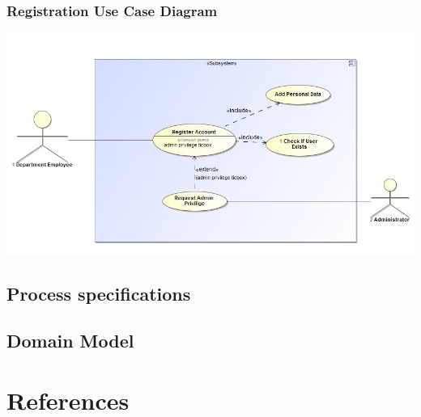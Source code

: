 \documentclass[a4paper,12pt]{article}
\begin{document}
	\subsubsection{Registration Use Case Diagram}
	\includegraphics[width=1\textwidth]{./Registration.jpg}\\[1.5cm] 
\subsection{Process specifications}
\subsection{Domain Model}

\newpage
\section{References}
\end{document}
